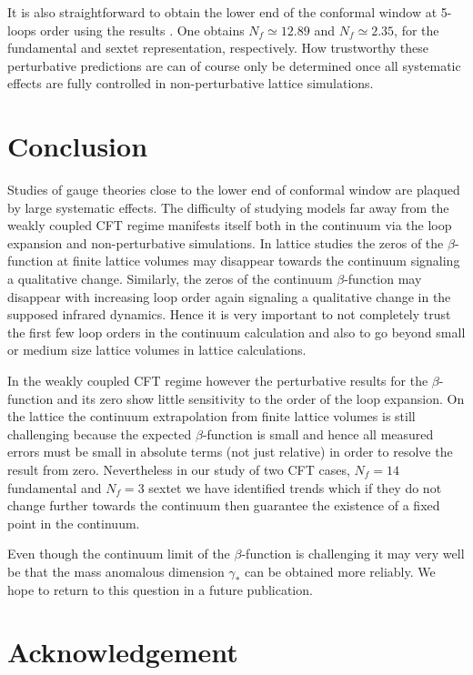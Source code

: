 \documentclass[epj]{webofc}
\begin{document}
It is also straightforward to obtain the lower end of the conformal window at 5-loops order 
using the results \cite{Baikov:2016tgj, Herzog:2017ohr}. One obtains $N_f \simeq 12.89$ and $N_f \simeq 2.35$,
for the fundamental and sextet representation, respectively. How trustworthy these perturbative predictions are can of
course only be determined once all systematic effects are fully controlled in non-perturbative lattice simulations.

\section{Conclusion}
\label{conclusion}

Studies of gauge theories close to the lower end of conformal window are plaqued by large systematic effects. 
The difficulty of studying models far away from the weakly coupled CFT regime manifests itself both in the continuum via
the loop expansion and non-perturbative simulations. In lattice studies the zeros of the
$\beta$-function at finite lattice volumes may disappear towards the continuum signaling a qualitative change.
Similarly, the zeros of the continuum $\beta$-function may disappear with increasing loop order again signaling a
qualitative change in the supposed infrared dynamics. Hence it is very important to not completely trust the first few
loop orders
in the continuum calculation and also to go beyond small or medium size lattice volumes in lattice calculations.

In the weakly coupled CFT regime however the perturbative results for the $\beta$-function and its zero 
show little sensitivity to the order of the loop expansion. On the lattice the continuum extrapolation from finite
lattice volumes is still challenging because the expected $\beta$-function is small and hence all measured errors must
be small in absolute terms (not just relative) in order to resolve the result from zero. Nevertheless in our study of
two CFT cases, $N_f = 14$ fundamental and $N_f = 3$ sextet we have identified trends which if they do not change further
towards the continuum then guarantee the existence of a fixed point in the continuum. 

Even though the continuum limit of the $\beta$-function is challenging it may very well be that the mass anomalous
dimension $\gamma_*$ can be obtained more reliably. We hope to return to this question in a future publication.


\section*{Acknowledgement}
\end{document}

